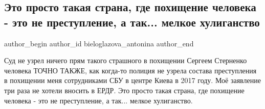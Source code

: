  
 
 
 
 
 
\subsection{Это просто такая страна, где похищение человека - это не преступление, а так... мелкое хулиганство}
\label{sec:31_05_2021.fb.bieloglazova_antonina.1.pohischenie_2017_sbu_kiev_tonja}
\ifcmt
 author_begin
   author_id bieloglazova_antonina
 author_end
\fi

Суд не узрел ничего прям такого страшного в похищении Сергеем Стерненко
человека ТОЧНО ТАКЖЕ, как когда-то полиция не узрела состава преступления в
похищении меня сотрудниками СБУ в центре Киева в 2017 году. Моё заявление три
раза не хотели вносить в ЕРДР.  Это просто такая страна, где похищение человека
- это не преступление, а так... мелкое хулиганство.

